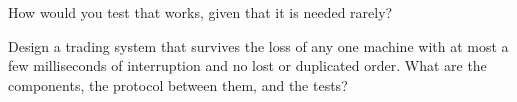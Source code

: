 \begin{interviewq}\label{iq:ll:resilience:5}
How would you test that  works, given that it is needed rarely?
\end{interviewq}

\begin{interviewq}\label{iq:ll:resilience:6}
Design a trading system that survives the loss of any one machine with at most a few milliseconds of interruption and no
lost or duplicated order. What are the components, the protocol between them, and the tests?
\end{interviewq}
